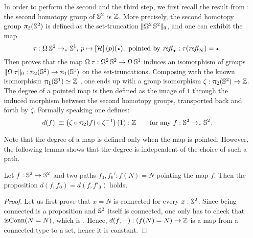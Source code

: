 \documentclass[english,a4]{article}
\renewcommand{\ap}[1]{\left[{#1}\right]}
\newcommand{\ptdto}{\to_\ast}%
\newcommand{\setTrunc}[1]{\Trunc{#1}_0}
\begin{document}
In order to perform the second and the third step, we first recall the result
from \cite[Cor. 8.5.2]{HoTT}: the second homotopy group of ${{\mathbb S^{2}}}$ is $\mathbb{Z}$. More
precisely, the second homotopy group $\uppi_{2}({{\mathbb S^{2}}})$ is defined as the
set-truncation $\setTrunc{\loopspace 2 \Sp}$, and one can exhibit the map
\begin{displaymath}
  \tau: \loopspace\null\Sp \ptdto \Sc, \, p \mapsto \ap\hopf(p)(\base),
\text{ pointed by $\refl{\base}:\tau(\refl{N})=\base$}.
\end{displaymath}
Then \cite[Section 8.4 and 8.5]{HoTT} proves that the map $\loopspace\null\tau :
\loopspace 2 \Sp \to \loopspace \null \Sc$ induces an isomorphism of groups
$\setTrunc{\loopspace\null\tau}: \hgr 2(\Sp) \to \hgr 1(\Sc)$ on the set-truncations.
Composing with the known isomorphism $\uppi_{1}({{\mathbb S^{1}}}) \simeq \mathbb{Z}$ \cite[Cor. 8.1.11]{HoTT}, one
ends up with a group isomorphism $\zeta: \uppi_{2}({{\mathbb S^{2}}}) \to \mathbb{Z}$. The degree of a
pointed map is then defined as the image of $1$ through the induced morphism
between the second homotopy groups, transported back and forth by $\zeta$. 
Formally speaking one defines: 
\begin{displaymath}
  d(f) \defequi \left(\zeta\circ\hgr 2(f)\circ \inv\zeta\right)(1):\ZZ \qquad
  \text{for any}\ f:\Sp\ptdto\Sp.
\end{displaymath}

Note that the degree of a map is defined only when the map is pointed. However,
the following lemma shows that the degree is independent of the choice of such
a path.
\begin{lemma}
  Let $f: {{\mathbb S^{2}}} \to {{\mathbb S^{2}}}$ and two paths $f_0,f_0': f(N) = N$ pointing the map $f$.
  Then the proposition $d(f,f_0) = d(f,f'_0)$ holds.
  \label{lem:deg-independent-path}
\end{lemma}
\begin{proof}
  Let us first prove that $x=N$ is connected for every $x:{{\mathbb S^{2}}}$. Since being
  connected is a proposition and ${{\mathbb S^{2}}}$ itself is connected, one only
  has to check that $\mathrm{isConn}(N=N)$, which is \cite[Cor. 8.3.3]{HoTT}.
  Hence, $d(f,\blank) : (f(N) = N) \to \ZZ$ is a map from a connected type to a set,
  hence it is constant. 
\end{proof}
\end{document}
